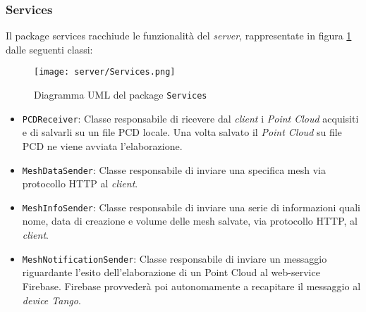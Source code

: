 \subsubsection{Services}
Il package services racchiude le funzionalità del \emph{server}, rappresentate in figura \ref{fig:Services} dalle seguenti classi:
\begin{figure}[!h] 
    \centering 
    \texttt{[image: server/Services.png]} 
    \caption{Diagramma UML del package \texttt{Services}}
   \label{fig:Services}
\end{figure}
\begin{itemize}
\item\texttt{PCDReceiver}: Classe responsabile di ricevere dal \emph{client} i \emph{Point Cloud} acquisiti e di salvarli su un file PCD locale. Una volta salvato il \emph{Point Cloud} su file PCD ne viene avviata l'elaborazione.
\item\texttt{MeshDataSender}: Classe responsabile di inviare una specifica mesh via protocollo HTTP al \emph{client}.
\item\texttt{MeshInfoSender}: Classe responsabile di inviare una serie di informazioni quali nome, data di creazione e volume delle mesh salvate, via protocollo HTTP, al \emph{client}.
\item\texttt{MeshNotificationSender}: Classe responsabile di inviare un messaggio riguardante l'esito dell'elaborazione di un Point Cloud al web-service Firebase. Firebase provvederà poi autonomamente a recapitare il messaggio al \emph{device Tango}.
\end{itemize}

